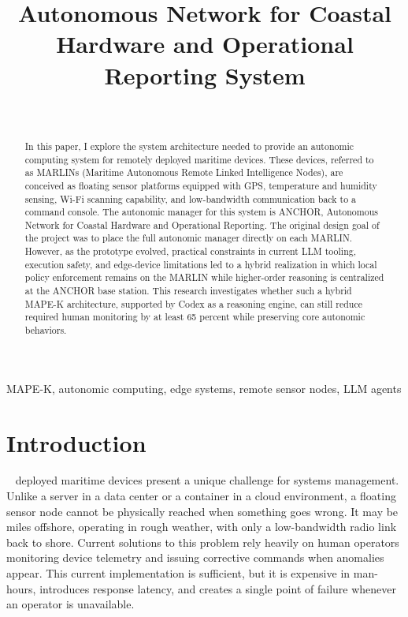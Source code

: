 \documentclass[journal]{IEEEtran}
\begin{document}
\title{Autonomous Network for Coastal Hardware and Operational Reporting System}

\author{
\\
}

\maketitle

\begin{abstract}
In this paper, I explore the system architecture needed to provide an autonomic computing system for remotely deployed maritime devices. These devices, referred to as MARLINs (Maritime Autonomous Remote Linked Intelligence Nodes), are conceived as floating sensor platforms equipped with GPS, temperature and humidity sensing, Wi-Fi scanning capability, and low-bandwidth communication back to a command console. The autonomic manager for this system is ANCHOR, Autonomous Network for Coastal Hardware and Operational Reporting. The original design goal of the project was to place the full autonomic manager directly on each MARLIN. However, as the prototype evolved, practical constraints in current LLM tooling, execution safety, and edge-device limitations led to a hybrid realization in which local policy enforcement remains on the MARLIN while higher-order reasoning is centralized at the ANCHOR base station. This research investigates whether such a hybrid MAPE-K architecture, supported by Codex as a reasoning engine, can still reduce required human monitoring by at least 65 percent while preserving core autonomic behaviors.
\end{abstract}

\begin{IEEEkeywords}
MAPE-K, autonomic computing, edge systems, remote sensor nodes, LLM agents
\end{IEEEkeywords}

\section{Introduction}~\label{intro}
 deployed maritime devices present a unique challenge for systems management. Unlike a server in a data center or a container in a cloud environment, a floating sensor node cannot be physically reached when something goes wrong. It may be miles offshore, operating in rough weather, with only a low-bandwidth radio link back to shore. Current solutions to this problem rely heavily on human operators monitoring device telemetry and issuing corrective commands when anomalies appear. This current implementation is sufficient, but it is expensive in man-hours, introduces response latency, and creates a single point of failure whenever an operator is unavailable.
\end{document}
